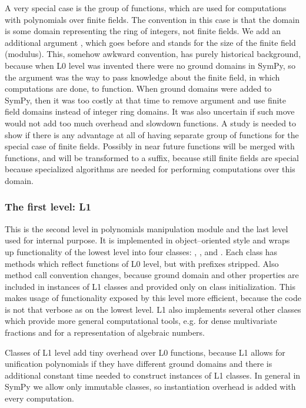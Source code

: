 A very special case is the group of  functions, which are used for computations with polynomials
over finite fields. The convention in this case is that the domain  is some domain representing
the ring of integers, not finite fields. We add an additional argument , which goes before 
and stands for the size of the finite field (modulus). This, somehow awkward convention, has purely
historical background, because when L0 level was invented there were no ground domains in SymPy, so
the argument  was the way to pass knowledge about the finite field, in which computations are
done, to  function. When ground domains were added to SymPy, then it was too costly at that
time to remove argument  and use finite field domains instead of integer ring domains. It was
also uncertain if such move would not add too much overhead and slowdown  functions. A study
is needed to show if there is any advantage at all of having separate group of functions for the
special case of finite fields. Possibly in near future  functions will be merged with 
functions, and  will be transformed to a suffix, because still finite fields are special
because specialized algorithms are needed for performing computations over this domain.


\subsubsection{The first level: L1}

This is the second level in polynomials manipulation module and the last level used for internal
purpose. It is implemented in object--oriented style and wraps up functionality of the lowest
level into four classes: , ,  and . Each class has methods which
reflect functions of L0 level, but with prefixes stripped. Also method call convention changes,
because ground domain and other properties are included in instances of L1 classes and provided
only on class initialization. This makes usage of functionality exposed by this level more
efficient, because the code is not that verbose as on the lowest level. L1 also implements
several other classes which provide more general computational tools, e.g.  for dense
multivariate fractions and  for a representation of algebraic numbers.

Classes of L1 level add tiny overhead over L0 functions, because L1 allows for unification
polynomials if they have different ground domains and there is additional constant time
needed to construct instances of L1 classes. In general in SymPy we allow only immutable
classes, so instantiation overhead is added with every computation.

